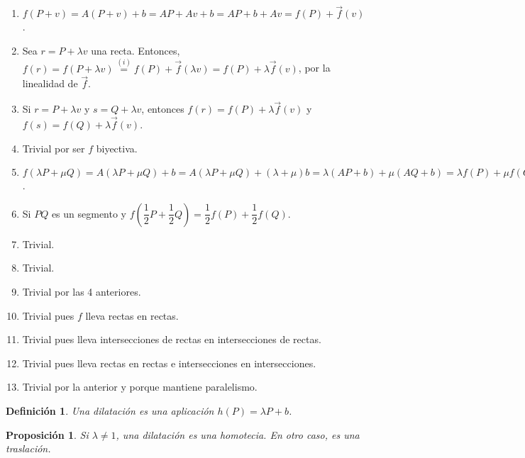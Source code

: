 \documentclass[11pt, a4paper]{article}
\makeatletter
\newif\IfInSansMode
\let\oldsf\sffamily
\renewcommand*{\sffamily}{\oldsf\mathversion{sans}\InSansModetrue}
\let\oldnorm\normalfont
\renewcommand*{\normalfont}{\oldnorm\InSansModefalse\mathversion{normal}}
\renewenvironment{proof}[1][\proofname] {\vspace{-15pt}\par\pushQED{\qed}\normalfont\topsep6\p@\@plus6\p@\relax\trivlist\item[\hskip\labelsep\it#1\@addpunct{.}]\ignorespaces}{\popQED\endtrivlist\@endpefalse}
\renewcommand{\vec}{\overrightarrow}
\renewenvironment{proof}[1][\proofname] {\par\pushQED{\qed}\normalfont\topsep6\p@\@plus6\p@\relax\trivlist\item[\hskip\labelsep\itshape\sffamily#1\@addpunct{.}]\ignorespaces}{\popQED\endtrivlist\@endpefalse}
\theoremstyle{theorem-style}
\newtheorem{nprop}{Proposición}[section]
\theoremstyle{definition-style}
\newtheorem{ndef}{Definición}[section]
\theoremstyle{remark-style}
\newtheorem*{nota}{Nota}
\theoremstyle{example-style}
\newenvironment{nlist}
{\begin{enumerate}
    \renewcommand\labelenumi{(\emph{\roman{enumi})}}}
  {\end{enumerate}}
\makeatother
\begin{document}
\begin{proof}\hfill
  \begin{nlist}
  \item $f(P+v) = A(P+v) + b = AP + Av + b = AP + b + Av = f(P) + \vec{f}(v)$.
  \item Sea $r = P + \lambda v$ una recta. Entonces, $f(r) = f(P + \lambda v) \overset{(i)}{=} f(P) + \vec{f}(\lambda v) = f(P) + \lambda \vec{f}(v)$, por la linealidad de $\vec{f}$.
  \item Si $r = P + \lambda v$ y $s = Q + \lambda v$, entonces $f(r) = f(P) + \lambda \vec{f}(v)$ y $f(s) = f(Q) + \lambda \vec{f}(v)$.
  \item Trivial por ser $f$ biyectiva.
  \item $f(\lambda P + \mu Q) = A(\lambda P + \mu Q) + b =A(\lambda P + \mu Q) + (\lambda + \mu)b = \lambda (AP + b) + \mu (AQ + b) = \lambda f(P) + \mu f(Q)$.
  \item Si $PQ$ es un segmento y $f(\dfrac{1}{2}P + \dfrac{1}{2}Q) = \dfrac{1}{2}f(P) +  \dfrac{1}{2}f(Q)$.
  \item Trivial.
  \item Trivial.
  \item Trivial por las 4 anteriores.
  \item Trivial pues $f$ lleva rectas en rectas.
  \item Trivial pues lleva intersecciones de rectas en intersecciones de rectas.
  \item Trivial pues lleva rectas en rectas e intersecciones en intersecciones.
  \item Trivial por la anterior y porque mantiene paralelismo.

    
  \end{nlist}
\end{proof}


\begin{ndef}
	Una dilatación es una aplicación $h(P) = \lambda P + b$. 
\end{ndef}

\begin{nprop} 
Si $\lambda \ne 1$, una dilatación es una homotecia. En otro caso, es una traslación. 
	
\end{nprop}

\end{document}
